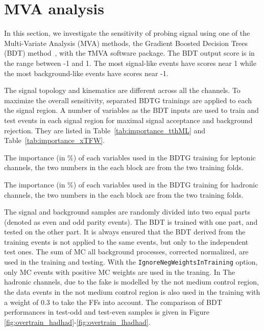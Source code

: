 \section{MVA analysis}
\label{sec:mva}

In this section, we investigate the sensitivity of probing signal using one of the Multi-Variate Analysis (MVA) methods, the Gradient Boosted Decision Trees (BDT) method~\cite{BDT,BDT2}, with the {\texttt TMVA} software package. The BDT output score is in the range between -1 and 1. The most signal-like events have scores near 1 while the most background-like events have scores near -1.

The signal topology and kinematics are different across all the channels. To maximize the overall sensitivity, separated BDTG trainings are applied to each the signal region. A number of variables as the BDT inputs are used to train and test events in each signal region for maximal signal acceptance and background rejection. They are listed in Table~\ref{tab:importance_tthML} and Table~\ref{tab:importance_xTFW}. 

\begin{table}
\caption{The importance (in \%) of each variables used in the BDTG training for leptonic channels, the two numbers in the each block are from the two training folds.}
\label{tab:importance_tthML}

\end{table}


\begin{table}
\caption{The importance (in \%) of each variables used in the BDTG training for hadronic channels, the two numbers in the each block are from the two training folds.}
\label{tab:importance_xTFW}

\end{table}

The signal and background samples are randomly divided into two equal parts (denoted as even and odd parity events). The BDT is trained with one part, and tested on the other part. It is always ensured that the BDT derived from the training events is not applied to the same events, but only to the independent test ones. The sum of MC all background processes, corrected normalized, are used in the training and testing. %
With the \texttt{IgnoreNegWeightsInTraining} option, only MC events with positive MC weights are used in the traning. In The hadronic channels, due to the fake is modelled by the not medium control region, the data events in the not medium control region is also used in the training with a weight of 0.3 to take the FFs into account. The comparison of BDT performances in test-odd and test-even samples is given in Figure \ref{fig:overtrain_hadhad}-\ref{fig:overtrain_lhadhad}.

